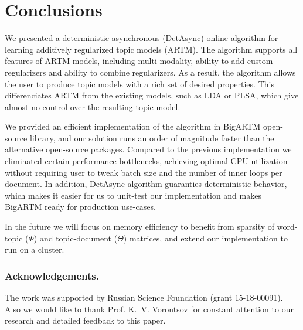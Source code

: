\documentclass[russian,english]{llncs}
\newcommand{\kw}[1]{\mbox{\textsf{#1}}}
\begin{document}
\section{Conclusions}
\label{sec:Conclusions}

We presented a deterministic asynchronous (\kw{DetAsync}) online algorithm for learning
additively regularized topic models (ARTM).
The algorithm supports all features of ARTM models,
including multi-modality, ability to add custom regularizers and
ability to combine regularizers.
As a result, the algorithm allows the user to produce topic models with a rich set of desired properties.
This differenciates ARTM from the existing models, such as LDA or PLSA,
which give almost no control over the resulting topic model.

We provided an efficient implementation of the algorithm in BigARTM open-source library,
and our solution runs an order of magnitude faster than
the alternative open-source packages.
Compared to the previous implementation we
eliminated certain performance bottlenecks,
achieving optimal CPU utilization without requiring user
to tweak batch size and the number of inner loops per document.
In addition, \kw{DetAsync} algorithm guaranties deterministic behavior,
which makes it easier for us to unit-test our implementation
and makes BigARTM ready for production use-cases.

In the future we will focus on memory efficiency
to benefit from sparsity of word-topic ($\Phi$) and topic-document ($\Theta$) matrices,
and extend our implementation to run on a cluster.

\bigskip
\subsubsection*{Acknowledgements.}
\nopagebreak
The work was supported by Russian Science Foundation (grant 15-18-00091).
Also we would like to thank Prof. K.~V. Vorontsov for constant attention to our research
and detailed feedback to this paper.

%
%
\end{document}
